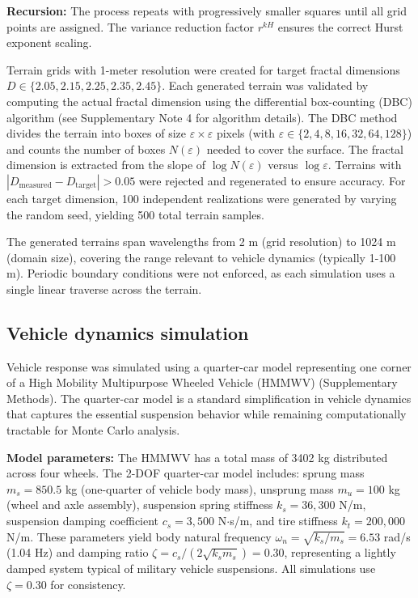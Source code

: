 \documentclass[11pt]{article}
\begin{document}
\textbf{Recursion:} The process repeats with progressively smaller squares until all grid points are assigned. The variance reduction factor $r^{kH}$ ensures the correct Hurst exponent scaling.

Terrain grids with 1-meter resolution were created for target fractal dimensions $D \in \{2.05, 2.15, 2.25, 2.35, 2.45\}$. Each generated terrain was validated by computing the actual fractal dimension using the differential box-counting (DBC) algorithm\cite{Sarkar1994} (see Supplementary Note 4 for algorithm details). The DBC method divides the terrain into boxes of size $\varepsilon \times \varepsilon$ pixels (with $\varepsilon \in \{2, 4, 8, 16, 32, 64, 128\}$) and counts the number of boxes $N(\varepsilon)$ needed to cover the surface. The fractal dimension is extracted from the slope of $\log N(\varepsilon)$ versus $\log \varepsilon$. Terrains with $|D_{\text{measured}} - D_{\text{target}}| > 0.05$ were rejected and regenerated to ensure accuracy. For each target dimension, 100 independent realizations were generated by varying the random seed, yielding 500 total terrain samples.

The generated terrains span wavelengths from 2 m (grid resolution) to 1024 m (domain size), covering the range relevant to vehicle dynamics (typically 1-100 m). Periodic boundary conditions were not enforced, as each simulation uses a single linear traverse across the terrain.

\subsection*{Vehicle dynamics simulation}

Vehicle response was simulated using a quarter-car model representing one corner of a High Mobility Multipurpose Wheeled Vehicle (HMMWV) (Supplementary Methods). The quarter-car model is a standard simplification in vehicle dynamics that captures the essential suspension behavior while remaining computationally tractable for Monte Carlo analysis.

\textbf{Model parameters:} The HMMWV has a total mass of 3402 kg distributed across four wheels. The 2-DOF quarter-car model includes: sprung mass $m_s = 850.5$ kg (one-quarter of vehicle body mass), unsprung mass $m_u = 100$ kg (wheel and axle assembly), suspension spring stiffness $k_s = 36,300$ N/m, suspension damping coefficient $c_s = 3,500$ N$\cdot$s/m, and tire stiffness $k_t = 200,000$ N/m. These parameters yield body natural frequency $\omega_n = \sqrt{k_s/m_s} = 6.53$ rad/s (1.04 Hz) and damping ratio $\zeta = c_s/(2\sqrt{k_s m_s}) = 0.30$, representing a lightly damped system typical of military vehicle suspensions. All simulations use $\zeta = 0.30$ for consistency.
\end{document}
